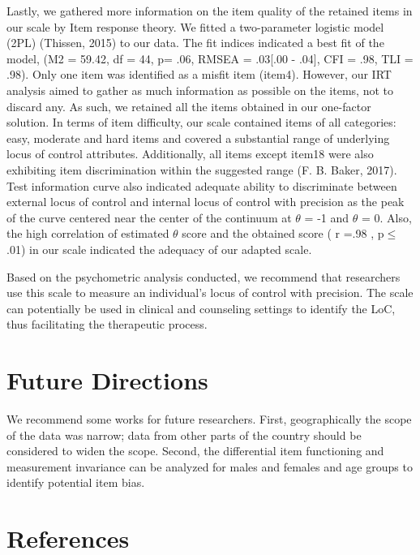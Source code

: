 \documentclass[
  man]{apa6}
\begin{document}
Lastly, we gathered more information on the item quality of the retained items in our scale by Item response theory. We fitted a two-parameter logistic model (2PL) (Thissen, 2015) to our data. The fit indices indicated a best fit of the model, (M2 = 59.42, df = 44, p= .06, RMSEA = .03{[}.00 - .04{]}, CFI = .98, TLI = .98). Only one item was identified as a misfit item (item4). However, our IRT analysis aimed to gather as much information as possible on the items, not to discard any. As such, we retained all the items obtained in our one-factor solution. In terms of item difficulty, our scale contained items of all categories: easy, moderate and hard items and covered a substantial range of underlying locus of control attributes. Additionally, all items except item18 were also exhibiting item discrimination within the suggested range (F. B. Baker, 2017). Test information curve also indicated adequate ability to discriminate between external locus of control and internal locus of control with precision as the peak of the curve centered near the center of the continuum at \(\theta\) = -1 and \(\theta\) = 0. Also, the high correlation of estimated \(\theta\) score and the obtained score ( r =.98 , p\(\le\).01) in our scale indicated the adequacy of our adapted scale.

Based on the psychometric analysis conducted, we recommend that researchers use this scale to measure an individual's locus of control with precision. The scale can potentially be used in clinical and counseling settings to identify the LoC, thus facilitating the therapeutic process.

\hypertarget{future-directions}{%
\section{Future Directions}\label{future-directions}}

We recommend some works for future researchers. First, geographically the scope of the data was narrow; data from other parts of the country should be considered to widen the scope. Second, the differential item functioning and measurement invariance can be analyzed for males and females and age groups to identify potential item bias.

\newpage

\hypertarget{references}{%
\section{References}\label{references}}
\end{document}
